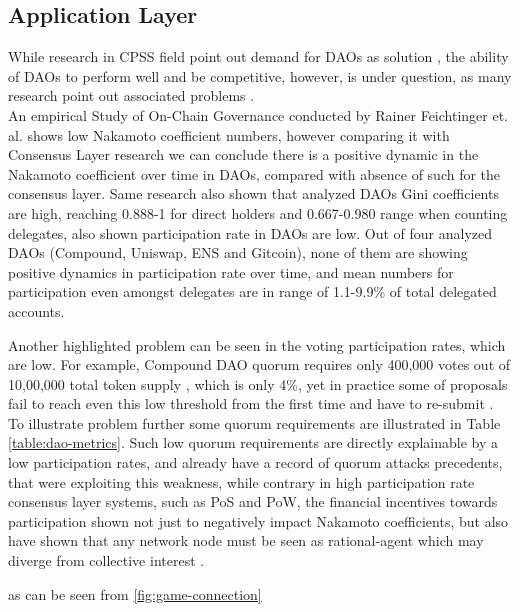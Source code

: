 \documentclass{article}
\begin{document}
\begin{CJK}{UTF8}{gbsn}
\begin{multicols}{2}
        \subsection{Application Layer}
        While research in CPSS field point out demand for DAOs as solution \cite{Fei2016}\cite{Wang2022}\cite{Juanjuan2023}, the ability of DAOs to perform well and be competitive, however, is under question, as many research point out associated problems \cite{Rainer2023}\cite{Marcella2016}\cite{Xuan2024}.  \\An empirical Study of On-Chain Governance conducted by Rainer Feichtinger et. al. \cite{Rainer2023} shows low Nakamoto coefficient numbers, however comparing it with Consensus Layer research \cite{Dominic2023} we can conclude there is a positive dynamic in the Nakamoto coefficient over time in DAOs, compared with absence of such for the consensus layer. Same research\cite{Rainer2023} also shown that analyzed DAOs Gini coefficients\cite{Lidia2012} are high, reaching 0.888-1 for direct holders and 0.667-0.980 range when counting delegates, also shown participation rate in DAOs are low. Out of four analyzed DAOs (Compound, Uniswap, ENS and Gitcoin), none of them are showing positive dynamics in participation rate over time, and mean numbers for participation even amongst delegates are in range of 1.1-9.9\% of total delegated accounts.


        Another highlighted problem can be seen in the voting participation rates, which are low. For example, Compound DAO quorum requires only 400,000 \cite{CompDAO} votes out of 10,00,000 total token supply \cite{CompToken}, which is only 4\%, yet in practice some of proposals fail to reach even this low threshold from the first time and have to re-submit \cite{CompProp232}\cite{CompProp237}. To illustrate problem further some quorum requirements are illustrated in Table \ref*{table:dao-metrics}. Such low quorum requirements are directly explainable by a low participation rates, and already have a record of quorum attacks \cite{AragonBlog}\cite{rhizoo2023} precedents, that were exploiting this weakness, while contrary in high participation rate consensus layer systems, such as PoS and PoW, the financial incentives towards participation shown not just to negatively impact  Nakamoto coefficients, but also have shown that any network node must be seen as rational-agent which may diverge from collective interest \cite{Philip2019}.

        \end{multicols}
        
        \begin{multicols}{2}
        as can be seen from \ref*{fig:game-connection}


\end{multicols}
\end{CJK}
\end{document}
